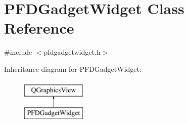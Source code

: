 \hypertarget{class_p_f_d_gadget_widget}{\section{P\-F\-D\-Gadget\-Widget Class Reference}
\label{class_p_f_d_gadget_widget}
}


{\ttfamily \#include $<$pfdgadgetwidget.\-h$>$}

Inheritance diagram for P\-F\-D\-Gadget\-Widget\-:\begin{figure}[H]
\begin{center}
\leavevmode
\includegraphics[height=2.000000cm]{class_p_f_d_gadget_widget}
\end{center}
\end{figure}

